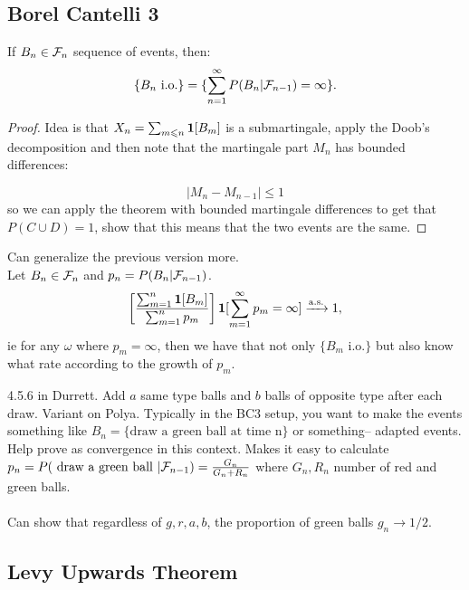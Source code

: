 \documentclass{article}
\begin{document}
\subsection{Borel Cantelli 3 }
\begin{theorem}
If $B_n\in \mathcal F_n$ sequence of events, then:
$$\{B_n \text{ i.o.} \} = \{\sum_{n=1}^\infty P(B_n|\mathcal F_{n-1}) =\infty\}.$$
\begin{proof}
	Idea is that $X_n = \sum_{m\leqslant n} \boldsymbol{1}[B_m]$ is a submartingale, apply the Doob's decomposition and then note that the martingale part $M_n$ has bounded differences:
	
	$$|M_n - M_{n-1}|\leq 1$$
	so we can apply the theorem with bounded martingale differences to get that $P(C\cup D) = 1$, show that this means that the two events are the same. 
\end{proof}
\end{theorem}
\begin{theorem}
Can generalize the previous version more. \\
Let $B_n\in \mathcal F_n$ and $p_n = P(B_n|\mathcal F_{n-1})$. 
$$\left[\frac{\sum_{m=1}^n \boldsymbol{1}[B_m] }{\sum_{m=1}^n p_m}\right] \boldsymbol{1}[\sum_{m=1}^\infty p_m = \infty] \xrightarrow{\mathrm{a.s.}} 1,$$
ie for any $\omega$ where $p_m = \infty$, then we have that not only $\{B_m \text{ i.o.} \}$ but also know what rate according to the growth of $p_m$.
\end{theorem}
\begin{example}
4.5.6 in Durrett. Add $a$ same type balls and $b$ balls of opposite type after each draw. Variant on Polya. Typically in the BC3 setup, you want to make the events something like $B_n = \{\text{draw a green ball at time n}\}$ or something-- adapted events. Help prove as convergence in this context. Makes it easy to calculate $p_n = P(\text{ draw a green ball } | \mathcal F_{n-1}) = \frac{G_{n}}{G_n + R_n}$ where $G_n, R_n$ number of red and green balls. \\\\

Can show that regardless of $g,r,a,b$, the proportion of green balls $g_n \to 1/2$. 
\end{example}



\subsection{Levy Upwards Theorem}
\end{document}
